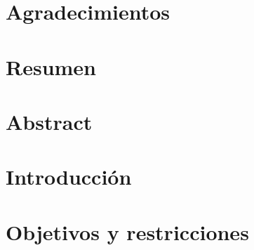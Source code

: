\documentclass[11pt,twoside]{docs/thesis}
\begin{document}
\maketitle
\makecoverletter

\chapter*{Agradecimientos} 

\makenomenclature


\chapter*{Resumen}  
\chapter*{Abstract} 


\tableofcontents %
\listoffigures 	  %
\renewcommand\listtablename{Índice de tablas}
\listoftables     %
\clearpage %
\mainmatter       %

\dominitoc
\cleardoublepage

\chapter{Introducción}



\chapter{Objetivos y restricciones}

\end{document}
